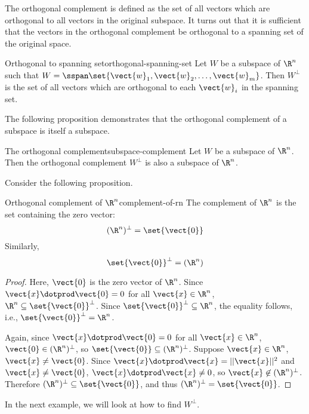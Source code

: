 The orthogonal complement is defined as the set of all vectors which are orthogonal to all vectors in the original subspace. It turns out that it is sufficient that the vectors in the orthogonal complement be orthogonal to a spanning set of the original space.

\begin{proposition}{Orthogonal to spanning set}{orthogonal-spanning-set}
Let $W$ be a subspace of $\R^n$ such that $W = \sspan \set{\vect{w}_1, \vect{w}_2,\ldots, \vect{w}_m }$. Then $W^{\perp}$ is the set of all vectors which are orthogonal to each $\vect{w}_i$ in the spanning set.
\end{proposition}

The following proposition demonstrates that the orthogonal complement of a subspace is itself a subspace.

\begin{proposition}{The orthogonal complement}{subspace-complement}
Let $W$ be a subspace of $\R^n$. Then the orthogonal complement $W^{\perp}$ is also a subspace of $\R^n$.
\end{proposition}

Consider the following proposition.

\begin{proposition}{Orthogonal complement of $\R^n$}{complement-of-rn}
The complement of $\R^n$ is the set containing the zero vector:
\[
 (\R^n)^{\perp} = \set{\vect{0} }
\]
Similarly,
\[
\set{\vect{0} }^{\perp} = (\R^n)
\]
\end{proposition}

\begin{proof}
Here, $\vect{0}$ is the zero vector of $\R^n$.
Since $\vect{x}\dotprod\vect{0}=0$ for all $\vect{x}\in\R^n$,
$\R^n\subseteq\set{\vect{0}}^{\perp}$.
Since $\set{\vect{0}}^{\perp}\subseteq\R^n$, the equality follows,
i.e., $\set{\vect{0}}^{\perp}=\R^n$.

Again, since $\vect{x}\dotprod\vect{0}=0$ for all $\vect{x}\in\R^n$,
$\vect{0}\in (\R^n)^{\perp}$, so $\set{\vect{0}}\subseteq(\R^n)^{\perp}$.
Suppose $\vect{x}\in\R^n$, $\vect{x}\neq\vect{0}$.
Since $\vect{x}\dotprod\vect{x}=||\vect{x}||^2$ and $\vect{x}\neq\vect{0}$,
$\vect{x}\dotprod\vect{x}\neq 0$, so $\vect{x}\not\in(\R^n)^{\perp}$.
Therefore $(\R^n)^{\perp}\subseteq \set{\vect{0}}$, and thus
$(\R^n)^{\perp}=\set{\vect{0}}$.
\end{proof}

In the next example, we will look at how to find
$W^{\perp}$.

